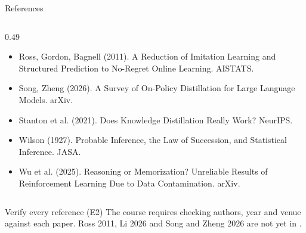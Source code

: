 \begin{frame}{References\hfill{}}
\begin{columns}[T]
\begin{column}{0.49\textwidth}
\begin{itemize}
        \item Ross, Gordon, Bagnell (2011). A Reduction of Imitation Learning and Structured Prediction to No-Regret Online Learning. AISTATS.
        \item Song, Zheng (2026). A Survey of On-Policy Distillation for Large Language Models. arXiv.
        \item Stanton et al. (2021). Does Knowledge Distillation Really Work? NeurIPS.
        \item Wilson (1927). Probable Inference, the Law of Succession, and Statistical Inference. JASA.
        \item Wu et al. (2025). Reasoning or Memorization? Unreliable Results of Reinforcement Learning Due to Data Contamination. arXiv.
      \end{itemize}
    \end{column}
  \end{columns}
  \vspace{0.1cm}
  \begin{todobox}{Verify every reference (E2)}
    The course requires checking authors, year and venue against each paper. Ross 2011, Li 2026 and
    Song and Zheng 2026 are not yet in .
  \end{todobox}
\end{frame}
